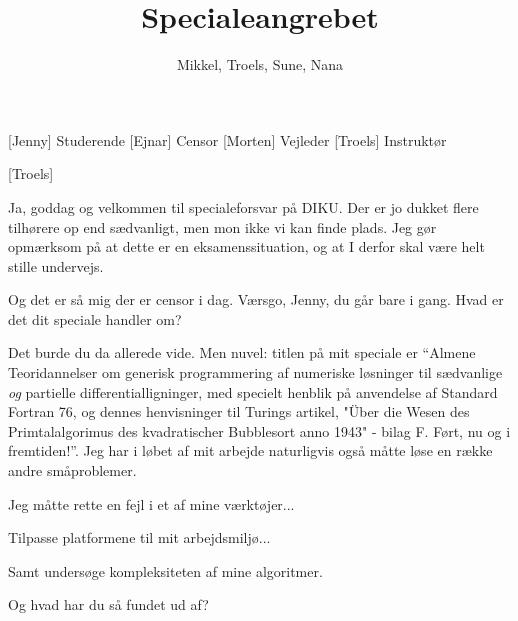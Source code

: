 \documentclass[a4paper,11pt]{article}
\title{Specialeangrebet}
\author{Mikkel, Troels, Sune, Nana}
\begin{document}
\maketitle
\begin{roles}
  [Jenny] Studerende
  [Ejnar] Censor
  [Morten] Vejleder
  [Troels] Instruktør
\end{roles}
\begin{props}
  [Troels]
\end{props}
\begin{sketch}


 Ja, goddag og velkommen til specialeforsvar på DIKU.  Der er
jo dukket flere tilhørere op end sædvanligt, men mon ikke vi kan finde
plads.  Jeg gør opmærksom på at dette er en eksamenssituation, og at I
derfor skal være helt stille undervejs.


 Og det er så mig der er censor i dag.  Værsgo, Jenny, du går
bare i gang.  Hvad er det dit speciale handler om?

  Det burde du da allerede vide.  Men
nuvel: titlen på mit speciale er ``Almene Teoridannelser om generisk
programmering af numeriske løsninger til sædvanlige \textit{og}
partielle differentialligninger, med specielt henblik på anvendelse af
Standard Fortran 76, og dennes henvisninger til Turings artikel, "Über
die Wesen des Primtalalgorimus des kvadratischer Bubblesort anno 1943"
- bilag F.  Ført, nu og i fremtiden!''.  Jeg har i løbet af mit
arbejde naturligvis også måtte løse en række andre småproblemer.

 Jeg måtte rette en fejl i et af mine værktøjer...


 Tilpasse platformene til mit arbejdsmiljø...


 Samt undersøge kompleksiteten af mine algoritmer.


  Og hvad har du så fundet ud af?


\end{sketch}
\end{document}
